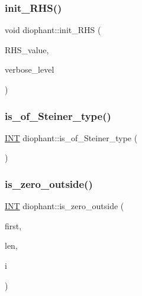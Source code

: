 \mbox{\label{classdiophant_a39b4b92e9141efc25e14ed8b7b72c0c0}} 
\subsubsection{\texorpdfstring{init\+\_\+\+R\+H\+S()}{init\_RHS()}}
{\footnotesize\ttfamily void diophant\+::init\+\_\+\+R\+HS (\begin{DoxyParamCaption}\item[{\mbox{\hyperlink{galois_8h_a09fddde158a3a20bd2dcadb609de11dc}{I\+NT}}}]{R\+H\+S\+\_\+value,  }\item[{\mbox{\hyperlink{galois_8h_a09fddde158a3a20bd2dcadb609de11dc}{I\+NT}}}]{verbose\+\_\+level }\end{DoxyParamCaption})}

\mbox{\label{classdiophant_a4363b76a603ecbd649fe116a6c11e27f}} 
\subsubsection{\texorpdfstring{is\+\_\+of\+\_\+\+Steiner\+\_\+type()}{is\_of\_Steiner\_type()}}
{\footnotesize\ttfamily \mbox{\hyperlink{galois_8h_a09fddde158a3a20bd2dcadb609de11dc}{I\+NT}} diophant\+::is\+\_\+of\+\_\+\+Steiner\+\_\+type (\begin{DoxyParamCaption}{ }\end{DoxyParamCaption})}

\mbox{\label{classdiophant_af22b9d5ddcfea6e215892dc506eaaa82}} 
\subsubsection{\texorpdfstring{is\+\_\+zero\+\_\+outside()}{is\_zero\_outside()}}
{\footnotesize\ttfamily \mbox{\hyperlink{galois_8h_a09fddde158a3a20bd2dcadb609de11dc}{I\+NT}} diophant\+::is\+\_\+zero\+\_\+outside (\begin{DoxyParamCaption}\item[{\mbox{\hyperlink{galois_8h_a09fddde158a3a20bd2dcadb609de11dc}{I\+NT}}}]{first,  }\item[{\mbox{\hyperlink{galois_8h_a09fddde158a3a20bd2dcadb609de11dc}{I\+NT}}}]{len,  }\item[{\mbox{\hyperlink{galois_8h_a09fddde158a3a20bd2dcadb609de11dc}{I\+NT}}}]{i }\end{DoxyParamCaption})}

